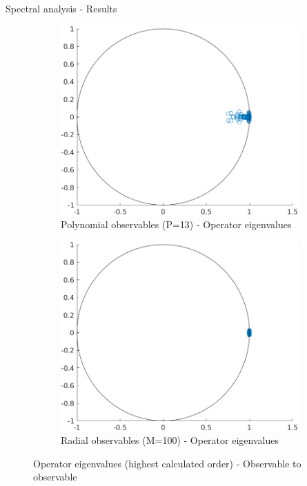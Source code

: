 \documentclass{beamer}
\begin{document}
\begin{frame}{Spectral analysis - Results}
    \begin{figure}
        \centering
        \begin{subfigure}[b]{0.45\textwidth}
            \centering
            \includegraphics[width=\textwidth]{Eigen_Poly.png}
            \caption{Polynomial observables (P=13) - Operator eigenvalues}
            \label{fig:eigen_poly}
        \end{subfigure}
        \hfill
        \begin{subfigure}[b]{0.45\textwidth}
            \centering
            \includegraphics[width=\textwidth]{Eigen_Radial.png}
            \caption{Radial observables (M=100) - Operator eigenvalues}
            \label{fig:eigen_radial}
        \end{subfigure}
        \caption{Operator eigenvalues (highest calculated order) - Observable to observable}
    \end{figure}
\end{frame}
\end{document}
